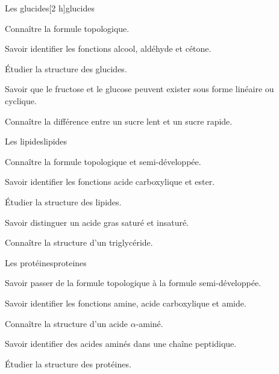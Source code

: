 \begin{multicols}{2}
  \begin{TP}{Les glucides}[2 h]{glucides}
    \begin{prerequis}
      \item Connaître la formule topologique.
      \item Savoir identifier les fonctions alcool, aldéhyde et cétone.
    \end{prerequis}
    \begin{objectifs}  
      \item Étudier la structure des glucides.
      \item Savoir que le fructose et le glucose peuvent exister sous forme linéaire ou cyclique.
      \item Connaître la différence entre un sucre lent et un sucre rapide.
    \end{objectifs}
  \end{TP}

  \begin{activite}{Les lipides}{lipides}
    \begin{prerequis}
      \item Connaître la formule topologique et semi-développée.
      \item Savoir identifier les fonctions acide carboxylique et ester.
    \end{prerequis}
    \begin{objectifs}
      \item Étudier la structure des lipides.
      \item Savoir distinguer un acide gras saturé et insaturé.
      \item Connaître la structure d'un triglycéride.
    \end{objectifs}
  \end{activite}

  \begin{activite}{Les protéines}{proteines}
    \begin{prerequis}
      \item Savoir passer de la formule topologique à la formule semi-développée.
      \item Savoir identifier les fonctions amine, acide carboxylique et amide.
    \end{prerequis}
    \begin{objectifs}
      \item Connaître la structure d'un acide $\alpha$-aminé.
      \item Savoir identifier des acides aminés dans une chaîne peptidique.
      \item Étudier la structure des protéines.
    \end{objectifs}
  \end{activite}


\end{multicols}
